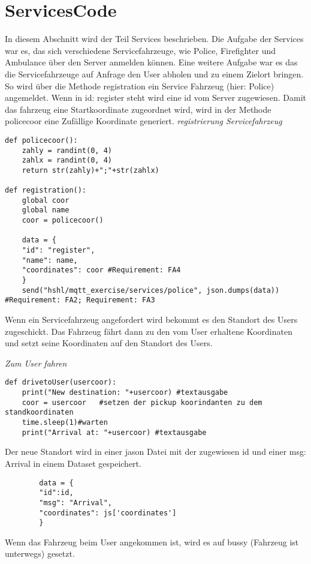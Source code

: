 \section{ServicesCode}
In diesem Abschnitt wird der Teil Services beschrieben. 
Die Aufgabe der Services war es, das sich verschiedene Servicefahrzeuge, wie Police, Firefighter und Ambulance über den Server anmelden können. Eine weitere Aufgabe war es das die Servicefahrzeuge auf Anfrage den User abholen und zu einem Zielort bringen.
So wird über die Methode registration ein Service Fahrzeug (hier: Police) angemeldet. Wenn in id: register steht wird eine id vom Server zugewiesen.
Damit das fahrzeug eine Startkoordinate zugeordnet wird, wird in der Methode policecoor eine Zufällige Koordinate generiert. 
\newline
\textit{registrierung Servicefahrzeug}
\begin{lstlisting}
def policecoor(): 
    zahly = randint(0, 4)
    zahlx = randint(0, 4)
    return str(zahly)+";"+str(zahlx)

def registration():
    global coor
    global name
    coor = policecoor()

    data = {
    "id": "register",
    "name": name,
    "coordinates": coor #Requirement: FA4
    }
    send("hshl/mqtt_exercise/services/police", json.dumps(data)) #Requirement: FA2; Requirement: FA3
\end{lstlisting}

Wenn ein Servicefahrzeug angefordert wird bekommt es den Standort des Users zugeschickt. 
Das Fahrzeug fährt dann zu den vom User erhaltene Koordinaten und setzt seine Koordinaten auf den Standort des Users.


\textit{Zum User fahren}
\begin{lstlisting}
def drivetoUser(usercoor):
    print("New destination: "+usercoor) #textausgabe
    coor = usercoor   #setzen der pickup koorindanten zu dem standkoordinaten
    time.sleep(1)#warten
    print("Arrival at: "+usercoor) #textausgabe
\end{lstlisting}


Der neue Standort wird in einer jason Datei mit der zugewiesen id und einer msg: Arrival in einem Dataset gespeichert.
\begin{lstlisting}
        data = {
        "id":id,
        "msg": "Arrival",
        "coordinates": js['coordinates']
        }
\end{lstlisting}
Wenn das Fahrzeug beim User angekommen ist, wird es auf bussy (Fahrzeug ist unterwegs) gesetzt.


